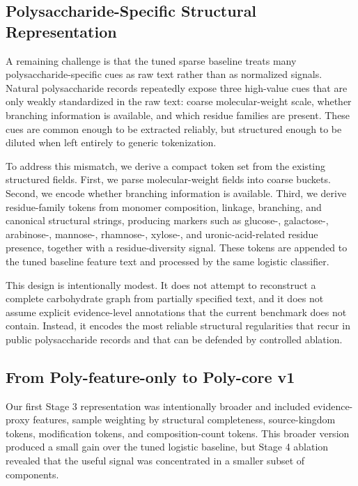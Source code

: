 \documentclass{article}
\begin{document}
\subsection{Polysaccharide-Specific Structural Representation}
\label{sec:polycore}

A remaining challenge is that the tuned sparse baseline treats many polysaccharide-specific cues as raw text rather than as normalized signals. Natural polysaccharide records repeatedly expose three high-value cues that are only weakly standardized in the raw text: coarse molecular-weight scale, whether branching information is available, and which residue families are present. These cues are common enough to be extracted reliably, but structured enough to be diluted when left entirely to generic tokenization.

To address this mismatch, we derive a compact token set from the existing structured fields. First, we parse molecular-weight fields into coarse buckets. Second, we encode whether branching information is available. Third, we derive residue-family tokens from monomer composition, linkage, branching, and canonical structural strings, producing markers such as glucose-, galactose-, arabinose-, mannose-, rhamnose-, xylose-, and uronic-acid-related residue presence, together with a residue-diversity signal. These tokens are appended to the tuned baseline feature text and processed by the same logistic classifier.

This design is intentionally modest. It does not attempt to reconstruct a complete carbohydrate graph from partially specified text, and it does not assume explicit evidence-level annotations that the current benchmark does not contain. Instead, it encodes the most reliable structural regularities that recur in public polysaccharide records and that can be defended by controlled ablation.

\subsection{From Poly-feature-only to Poly-core v1}
\label{sec:refinement}

Our first Stage 3 representation was intentionally broader and included evidence-proxy features, sample weighting by structural completeness, source-kingdom tokens, modification tokens, and composition-count tokens. This broader version produced a small gain over the tuned logistic baseline, but Stage 4 ablation revealed that the useful signal was concentrated in a smaller subset of components.
\end{document}
